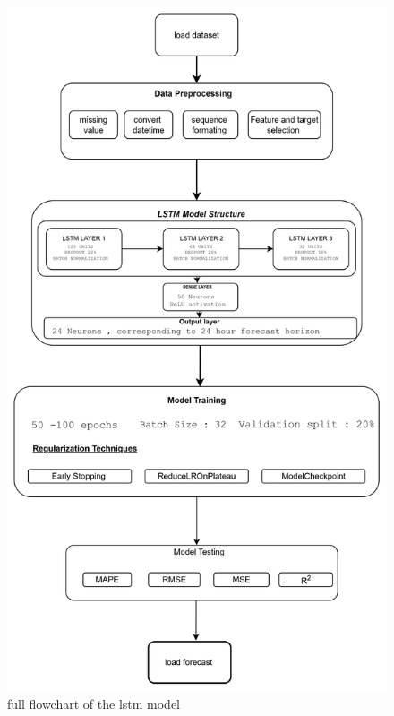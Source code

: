 \begin{figure}[h]
	\centering
	\includegraphics[width=0.7\linewidth]{Chapters/images/lstm_flowchart}
	\caption{full flowchart of the lstm model}
	\label{fig:lstmflowchart}
\end{figure}
